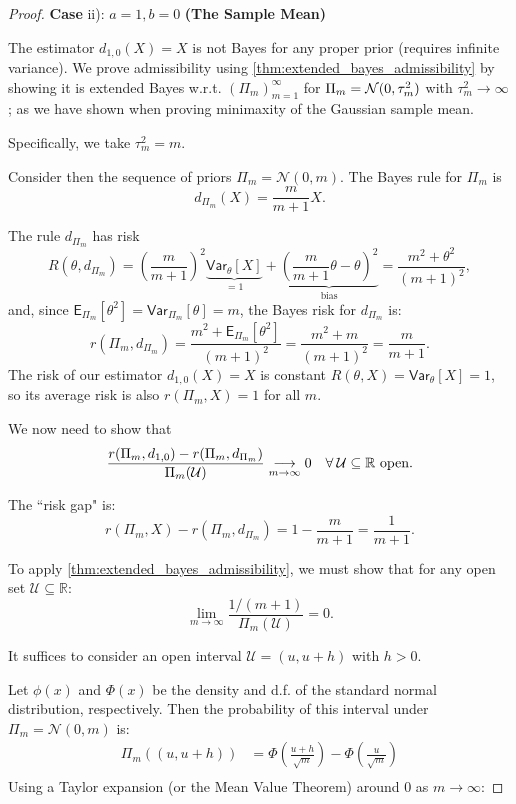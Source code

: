 \begin{proof}
\textbf{Case} ii): \(a=1, b=0\) \textbf{(The Sample Mean)}

The estimator \(d_{1,0}(X) = X\) is not Bayes for any proper prior (requires infinite variance). We prove admissibility using \autoref{thm:extended_bayes_admissibility}  by showing it is extended Bayes w.r.t. \((\Pi_{m})^{\infty}_{m=1}\) for \(\Pi_{m} = \mathcal{N}(0,\tau ^2_{m})\) with \(\tau ^2_{m} \to \infty\); as we have shown when proving minimaxity of the Gaussian sample mean.

Specifically, we take \(\tau ^2_{m}=m\).
 
Consider then the sequence of priors \(\Pi_m = \mathcal{N}(0, m)\).
The Bayes rule for \(\Pi_m\) is
\[
    d_{\Pi_m}(X) = \frac{m}{m+1}X .
\]

The rule \(d_{\Pi_{m}}\) has risk 
\[
    R(\theta,d_{\Pi_{m}}) = \left( \frac{m}{m+1} \right) ^2 \underbrace{\mathsf{Var}_{\theta}\left[X\right]}_{=1} + \underbrace{\left( \frac{m}{m+1}\theta-\theta \right) ^2}_{\text{bias}} = \frac{m^2+\theta^2}{(m+1)^2},
\]
and, since \(\mathsf{E}_{\Pi_{m}}\left[\theta^2\right] = \mathsf{Var}_{\Pi_{m}}\left[\theta\right] =m\),
the Bayes risk for \(d_{\Pi_m}\) is:
\[
	r(\Pi_m, d_{\Pi_m}) = \frac{m^2+\mathsf{E}_{\Pi_{m}}\left[\theta^2\right] }{(m+1)^2}= \frac{m^2+m}{(m+1)^2}= \frac{m}{m+1}.
\]
The risk of our estimator \(d_{1,0}(X) = X\) is constant \(R(\theta, X) = \mathsf{Var}_{\theta}\left[X\right]  = 1\), so its average risk is also \(r(\Pi_m, X) = 1\) for all \(m\).

We now need to show that 
\[
    \frac{r(\Pi_{m},d_{1,0}) - r(\Pi_{m},d_{\Pi_{m}})}{\Pi_{m}(\mathcal{U })} \underset{m\to \infty}{\longrightarrow} 0 \quad \forall \: \mathcal{U }\subseteq \mathbb{R} \text{ open}.
\]


The ``risk gap" is:
\[ r(\Pi_m, X) - r(\Pi_m, d_{\Pi_m}) = 1 - \frac{m}{m+1} = \frac{1}{m+1}. \]

To apply \autoref{thm:extended_bayes_admissibility}, we must show that for any open set \(\mathcal{U} \subseteq \mathbb{R}\):
\[ \lim_{m \to \infty} \frac{1/(m+1)}{\Pi_m(\mathcal{U})} = 0. \]

It suffices to consider an open interval \(\mathcal{U} = (u, u+h)\) with \(h > 0\).

Let \(\phi(x)\) and \(\Phi(x)\) be the density and d.f. of the standard normal distribution, respectively.
Then the probability of this interval under \(\Pi_m = \mathcal{N}(0, m)\) is:
\[ 
    \begin{split}
        \Pi_m((u, u+h)) &= \Phi\left(\frac{u+h}{\sqrt{m}}\right) - \Phi\left(\frac{u}{\sqrt{m}}\right)\\
    \end{split}
\]
Using a Taylor expansion (or the Mean Value Theorem) around 0 as \(m \to \infty\):


\end{proof}

